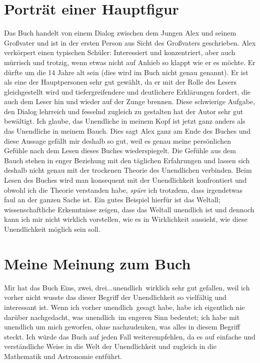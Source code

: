 \documentclass[a4paper,12pt]{article}
\begin{document}
\section{Porträt einer Hauptfigur}\newline
Das Buch handelt von einem Dialog zwischen dem Jungen Alex und seinem Großvater und ist in der ersten Person aus Sicht des Großvaters geschrieben.\newline
Alex verkörpert einen typischen Schüler: Interessiert und konzentriert, aber auch mürrisch und trotzig, wenn etwas nicht auf Anhieb so klappt wie er es möchte. Er dürfte um die 14 Jahre alt sein (dies wird im Buch nicht genau genannt).\newline
Er ist als eine der Hauptpersonen sehr gut gewählt, da er mit der Rolle des Lesers gleichgestellt wird und tiefergreifendere und deutlichere Erklärungen fordert, die auch dem Leser hin und wieder auf der Zunge brennen. Diese schwierige Aufgabe, den Dialog lehrreich und fesselnd zugleich zu gestalten hat der Autor sehr gut bewältigt.
\glqq Ich glaube, das Unendliche in meinem Kopf ist jetzt ganz anders als das Unendliche in meinem Bauch.\grqq \newline
\newline
Dies sagt Alex ganz am Ende des Buches und diese Aussage gefällt mir deshalb so gut, weil es genau meine persönlichen Gefühle nach dem Lesen dieses Buches wiederspiegelt. Die Gefühle aus dem Bauch stehen in enger Beziehung mit den täglichen Erfahrungen und lassen sich deshalb nicht genau mit der trockenen Theorie des Unendlichen verbinden. Beim Lesen des Buches wird man konsequent mit der Unendlichkeit konfrontiert und obwohl ich die Theorie verstanden habe, \textit{spüre} ich trotzdem, dass irgendetwas faul an der ganzen Sache ist. Ein gutes Beispiel hierfür ist das Weltall; wissenschaftliche Erkenntnisse zeigen, dass das Weltall unendlich ist und dennoch kann ich mir nicht wirklich vorstellen, wie es in Wirklichkeit aussieht, wie diese Unendlichkeit möglich sein soll.
\section{Meine Meinung zum Buch}\newline
Mir hat das Buch \glqq Eins, zwei, drei...unendlich\grqq\  wirklich sehr gut gefallen, weil ich vorher nicht wusste das dieser Begriff der Unendlichkeit so vielfältig und interessant ist. Wenn ich vorher \glqq unendlich\grqq\  gesagt habe, habe ich eigentlich nie darüber nachgedacht, was \glqq unendlich\grqq\  im engeren Sinn bedeutet; ich habe mit unendlich um mich geworfen, ohne nachzudenken, was alles in diesem Begriff steckt.\newline
Ich würde das Buch auf jeden Fall weiterempfehlen, da es auf einfache und verständliche Weise in die Welt der Unendlichkeit und zugleich in die Mathematik und Astronomie entführt.
\end{document}
